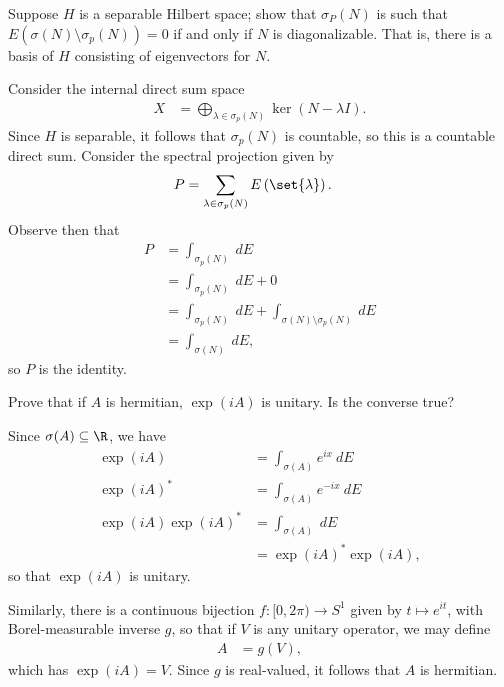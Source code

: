 \documentclass[10pt]{mypackage}
\begin{document}
\begin{problem}
  Suppose $H$ is a separable Hilbert space; show that $\sigma_P(N)$ is such that $E\left( \sigma(N)\setminus \sigma_p(N) \right) = 0$ if and only if $N$ is diagonalizable. That is, there is a basis of $H$ consisting of eigenvectors for $N$.
\end{problem}
\begin{solution}
  Consider the internal direct sum space
  \begin{align*}
    X &= \bigoplus_{\lambda\in \sigma_p(N)} \ker\left( N-\lambda I \right).
  \end{align*}
  Since $H$ is separable, it follows that $\sigma_p(N)$ is countable, so this is a countable direct sum. Consider the spectral projection given by
  \begin{align*}
    P &= \sum_{\lambda\in \sigma_p(N)} E\left( \set{\lambda} \right).
  \end{align*}
  Observe then that
  \begin{align*}
    P &= \int_{\sigma_p(N)}^{} \:dE\\
      &= \int_{\sigma_p(N)}^{} \:dE + 0\\
      &= \int_{\sigma_p(N)}^{} \:dE + \int_{\sigma(N)\setminus \sigma_p(N)}^{} \:dE\\
      &= \int_{\sigma(N)}^{} \:dE,
  \end{align*}
  so $P$ is the identity.
\end{solution}
\begin{problem}
  Prove that if $A$ is hermitian, $\exp(iA)$ is unitary. Is the converse true?
\end{problem}
\begin{solution}
  Since $\sigma(A)\subseteq \R$, we have
  \begin{align*}
    \exp(iA) &= \int_{\sigma(A)}^{} e^{ix}\:dE\\
    \exp\left( iA \right)^{\ast} &= \int_{\sigma(A)}^{} e^{-ix}\:dE\\
    \exp\left( iA \right)\exp\left( iA \right)^{\ast} &= \int_{\sigma(A)}^{} \:dE\\
                                                      &= \exp\left( iA \right)^{\ast}\exp\left( iA \right),
  \end{align*}
  so that $\exp\left( iA \right)$ is unitary.

  Similarly, there is a continuous bijection $f\colon [0,2\pi)\rightarrow S^{1}$ given by $t\mapsto e^{it}$, with Borel-measurable inverse $g$, so that if $V$ is any unitary operator, we may define
  \begin{align*}
    A &= g\left( V \right),
  \end{align*}
  which has $\exp\left( iA \right) = V$. Since $g$ is real-valued, it follows that $A$ is hermitian.
\end{solution}
\end{document}
